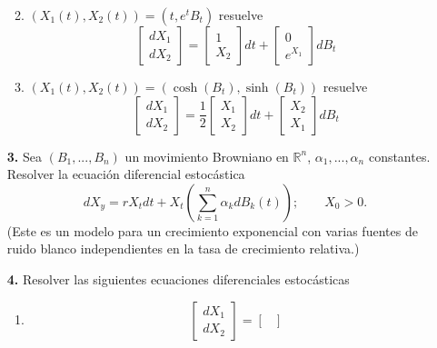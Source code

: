 \documentclass[letterpaper]{article}
\newcommand{\R}{\mathbb{R}}
\newcommand{\1}{\mathds{1}}
\theoremstyle{definition}
\theoremstyle{definition}
\theoremstyle{definition}
\theoremstyle{definition}
\theoremstyle{definition}
\begin{document}
\begin{enumerate}
\begin{enumerate}
\[        \]
        \item $(X_1(t),X_2(t))=(t,e^{t}B_t)$ resuelve 
        \[
        \begin{bmatrix}
            dX_1\\
            dX_2
        \end{bmatrix}
        =
        \begin{bmatrix}
            1\\
            X_2
        \end{bmatrix}dt
        +
        \begin{bmatrix}
            0\\
            e^{X_1}
        \end{bmatrix}dB_t
        \]  
        \item $(X_1(t), X_2(t))=(\cosh(B_t),\sinh(B_t))$ resuelve 
            \[
            \begin{bmatrix}
                dX_1\\
                dX_2
            \end{bmatrix}
            =\frac{1}{2}
            \begin{bmatrix}
                X_1\\
                X_2
            \end{bmatrix}dt
            +
            \begin{bmatrix}
                X_2\\
                X_1
            \end{bmatrix}dB_t
            \]  
     \end{enumerate}
    \item[\textbf{3.}] Sea $(B_1,...,B_n)$ un movimiento Browniano en $\R^n$, $\alpha_1,...,\alpha_n$ 
    constantes. Resolver la ecuación diferencial estocástica 
    \[
    dX_y=rX_tdt+X_t \left(\sum_{k=1}^n \alpha_k dB_k(t)\right); \qquad X_0>0.    
    \]
    (Este es un modelo para un crecimiento exponencial con varias fuentes de ruido blanco independientes 
    en la tasa de crecimiento relativa.)
    \item[\textbf{4.}] Resolver las siguientes ecuaciones diferenciales estocásticas 
    \begin{enumerate}
        \item \[
            \begin{bmatrix}
            dX_1\\
            dX_2
        \end{bmatrix}= \begin{bmatrix}

\end{bmatrix}\]
\end{enumerate}
\end{enumerate}
\end{document}

